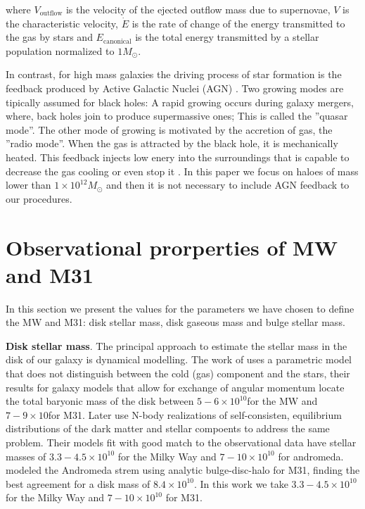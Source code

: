 \documentclass[usenatbib]{mn2e}
\newcommand{\Msun}{{\ifmmode{{\rm {M_{\odot}}}}\else{${\rm{M_{\odot}}}$}\fi}}
\begin{document}
where  $V_{\text{outflow}}$ is the velocity of the ejected outflow
mass due to supernovae, $V$ is the characteristic velocity,  $\dot{E}$
is the rate of change of the energy transmitted to the gas by stars
and $E_{\text{canonical}}$ is the total energy transmitted by a
stellar population normalized to $1M_{\odot}$. 
 

In contrast, for high mass galaxies the driving process of star
formation is the feedback produced by Active Galactic Nuclei (AGN)
\citep{2006MNRAS.365...11C}. Two growing modes are tipically assumed
for black holes: A rapid growing occurs during galaxy mergers, where,
back holes join to produce supermassive ones; This is called the
''quasar mode''. The other mode of growing is motivated by the
accretion of gas, the ''radio mode''. When the gas is attracted by the
black hole, it is mechanically heated. This feedback injects low enery
into the surroundings that is capable to decrease the gas cooling or
even stop it \citep{2006MNRAS.365...11C}. In this paper we focus on
haloes of mass lower than $1\times 10^{12}M_{\odot}$ and then it is
not necessary to include AGN feedback to our procedures. 


\section{Observational prorperties of MW and M31}  
\label{sec:discussion}  

In this section we present the values for the parameters we have
chosen to define the MW and M31: disk stellar mass, disk gaseous mass
and bulge stellar mass. 

{\bf Disk stellar mass}. The principal approach to estimate the
stellar mass in the disk of our galaxy is dynamical modelling. The
work of \cite{Klypin2002} uses a parametric model that does not
distinguish between the cold (gas) component and the stars, their
results for galaxy models that allow for exchange of angular momentum
locate the total baryonic mass of the disk between $5-6\times
10^{10}$\Msun for the MW and $7-9\times 10$\Msun for M31. Later
\cite{Widrow2005} use N-body realizations of self-consisten,
equilibrium distributions of the dark matter and stellar compoents to
address the same problem. Their models fit with good match to the
observational data have stellar masses of $3.3-4.5\times 10^{10}$\Msun
for the Milky Way and $7-10\times 10^{10}$ for
andromeda. \citep{Geehan2006} modeled the Andromeda strem using
analytic bulge-disc-halo for M31, finding the best agreement for a
disk mass of $8.4\times 10^{10}$\Msun. In this work we take
$3.3-4.5\times 10^{10}$\Msun for the Milky Way and $7-10\times
10^{10}$ for M31.   
\end{document}
